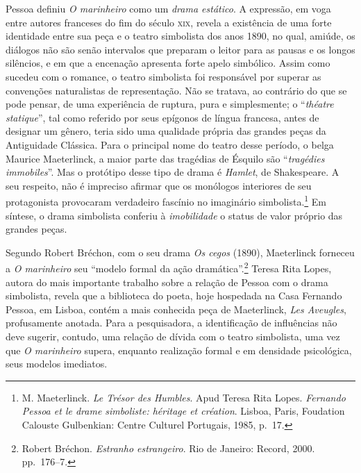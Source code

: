 Pessoa definiu \textit{O marinheiro} como um
\textit{drama estático}. A expressão, em voga entre
autores franceses do fim do século \textsc{xix}, revela
a existência de uma forte identidade entre sua peça e o teatro
simbolista dos anos 1890, no qual, amiúde, os diálogos 
não são senão intervalos que preparam o leitor para 
as pausas e os longos silêncios,
e em que a encenação apresenta forte apelo simbólico.
Assim como sucedeu com o romance, o teatro simbolista 
foi responsável por superar
as convenções naturalistas de representação. Não se tratava, ao
contrário do que se pode pensar, de uma experiência 
de ruptura, pura e simplesmente; o ``\textit{théatre statique}'',
tal como referido por seus epígonos
de língua francesa, antes de designar um gênero, teria sido uma
qualidade própria das grandes peças da Antiguidade Clássica. Para o
principal nome do teatro desse período, 
o belga Maurice Maeterlinck, a
maior parte das tragédias de Ésquilo são 
``\textit{tragédies immobiles}''. Mas o
protótipo desse tipo de drama é 
\textit{Hamlet}, de Shakespeare. A seu
respeito, não é impreciso afirmar que os 
monólogos interiores de seu
protagonista provocaram verdadeiro fascínio no imaginário
simbolista.\footnote{ M. Maeterlinck.
\textit{Le Trésor des Humbles}.
Apud Teresa Rita Lopes. \textit{Fernando Pessoa 
et le drame simboliste: héritage et création}.
Lisboa, Paris, Foudation Calouste Gulbenkian:
Centre Culturel Portugais, 1985, p.~17.} Em síntese, o drama
simbolista conferiu à \textit{imobilidade} o status
de valor próprio das grandes peças. 

Segundo Robert Bréchon, com o seu drama \textit{Os cegos} (1890),
Maeterlinck forneceu a \textit{O marinheiro} seu 
“modelo formal da ação dramática”.\footnote{ Robert Bréchon.
\textit{Estranho estrangeiro}.
Rio de Janeiro: Record, 2000. pp.~176--7.} 
Teresa Rita Lopes, autora do
mais importante trabalho sobre a relação de Pessoa com o drama
simbolista, revela que a biblioteca do poeta, hoje 
hospedada na Casa Fernando Pessoa, em Lisboa, 
contém a mais conhecida peça de Maeterlinck,
\textit{Les Aveugles}, profusamente anotada. Para
a pesquisadora, a identificação de influências não deve sugerir,
contudo, uma relação de dívida com o teatro simbolista, uma vez que
\textit{O marinheiro} supera, enquanto realização formal e 
em densidade psicológica, seus modelos imediatos.

